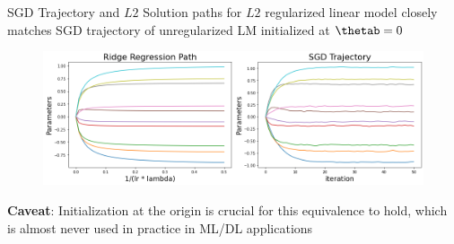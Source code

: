 \documentclass[11pt,compress,t,notes=noshow, xcolor=table]{beamer}
\begin{document}
\begin{vbframe}{SGD Trajectory and $L2$ }
Solution paths for $L2$ regularized linear model closely matches SGD trajectory of unregularized LM initialized at $\thetab=0$ 
\lz
  \begin{figure}
    \centering
      {\includegraphics{figure_man/ridge-vs-sgd-path.png}}
  \end{figure}

\textbf{Caveat}: Initialization at the origin is crucial for this equivalence to hold, which is almost never used in practice in ML/DL applications

\end{vbframe}

\endlecture
\end{document}
